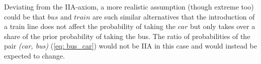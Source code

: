 Deviating from the IIA-axiom, a more realistic assumption (though extreme too) could be that $bus$ and $train$ are such similar alternatives that the introduction of a train line does not affect the probability of taking the $car$ but only takes over a share of the prior probability of taking the bus. The ratio of probabilities of the pair \textit{(car, bus)} (\ref{eq: bus_car}) would not be IIA in this case and would instead be expected to change.
%
